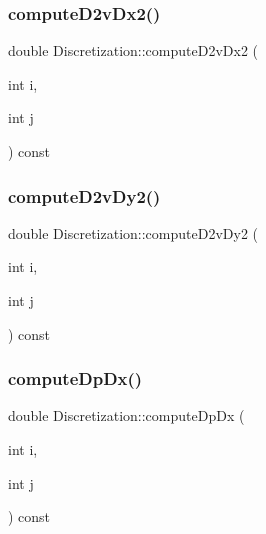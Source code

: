 \subsubsection{\texorpdfstring{computeD2vDx2()}{computeD2vDx2()}}
{\footnotesize\ttfamily double Discretization\+::compute\+D2v\+Dx2 (\begin{DoxyParamCaption}\item[{int}]{i,  }\item[{int}]{j }\end{DoxyParamCaption}) const\hspace{0.3cm}{\ttfamily [virtual]}}

\mbox{\label{classDiscretization_a56678582a049b1b141621e41afff1438}} 
\subsubsection{\texorpdfstring{computeD2vDy2()}{computeD2vDy2()}}
{\footnotesize\ttfamily double Discretization\+::compute\+D2v\+Dy2 (\begin{DoxyParamCaption}\item[{int}]{i,  }\item[{int}]{j }\end{DoxyParamCaption}) const\hspace{0.3cm}{\ttfamily [virtual]}}

\mbox{\label{classDiscretization_aed3ad75ad6e647d14f118a12652c01b2}} 
\subsubsection{\texorpdfstring{computeDpDx()}{computeDpDx()}}
{\footnotesize\ttfamily double Discretization\+::compute\+Dp\+Dx (\begin{DoxyParamCaption}\item[{int}]{i,  }\item[{int}]{j }\end{DoxyParamCaption}) const\hspace{0.3cm}{\ttfamily [virtual]}}

\mbox{\label{classDiscretization_a859f4dc33f0ea91f5e6537be09ce4999}} 
